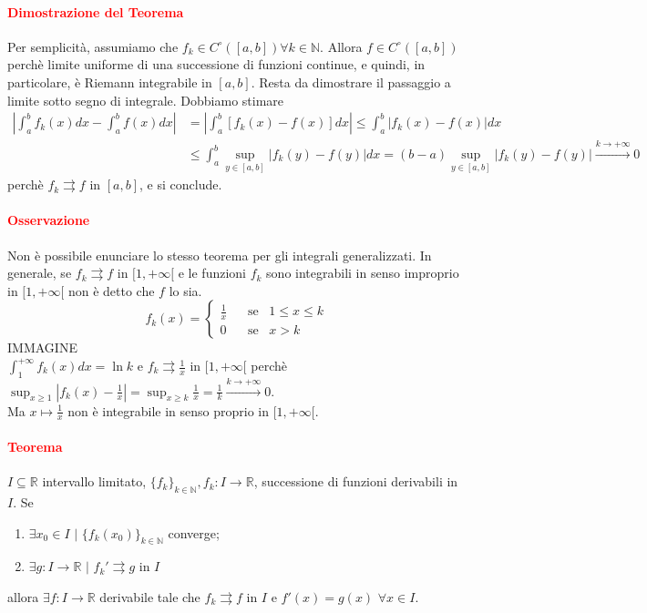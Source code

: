 \documentclass{article}
\newcommand{\R}{\mathbb{R}}
\newcommand{\N}{\mathbb{N}}
\begin{document}
\paragraph{\textcolor{red}{Dimostrazione del Teorema}}
Per semplicità, assumiamo che $f_k \in C^\circ([a,b])\forall k \in \N$. Allora $f\in C^\circ([a,b])$ perchè limite uniforme di una successione di funzioni continue, e quindi, in particolare, è Riemann integrabile in $[a,b]$. Resta da dimostrare il passaggio a limite sotto segno di integrale. Dobbiamo stimare 
\begin{align*}
    |\int_{a}^{b}f_k(x) dx -\int_{a}^{b}f(x)dx|&=|\int_{a}^{b} [f_k(x)-f(x)]dx|\leq \int_{a}^{b}|f_k(x)-f(x)|dx\\ &\leq \int_{a}^{b}\sup_{y \in [a,b]} |f_k(y)-f(y)|dx= (b-a)\sup_{y \in [a,b]} |f_k(y)-f(y)| \xrightarrow{k \rightarrow+\infty} 0
\end{align*}
perchè $f_k \rightrightarrows f$ in $[a,b]$, e si conclude.
\begin{flushright}
\large\Lightning
\end{flushright}

\paragraph{\textcolor{red}{Osservazione}}
Non è possibile enunciare lo stesso teorema per gli integrali generalizzati. In generale, se $f_k \rightrightarrows f$ in $[1,+\infty[$ e le funzioni $f_k$ sono integrabili in senso improprio in $[1,+\infty[$ non è detto che $f$ lo sia. \\
\begin{equation*}
    f_k(x)=\begin{cases}
        \frac{1}{x} \,\,\,\,\,&\text{se} \,\,\,\,\,1 \leq x \leq k\\
        0\,\,\,\,\,&\text{se}\,\,\,\,\, x >k
    \end{cases}
\end{equation*}
IMMAGINE\\
$\int_{1}^{+\infty}f_k(x)dx=\ln k$ e $f_k \rightrightarrows \frac{1}{x}$ in $[1,+\infty[$ perchè $\sup_{x \geq 1}|f_k(x) -\frac{1}{x}|=\sup_{x \geq k}\frac{1}{x}=\frac{1}{k} \xrightarrow{k \rightarrow +\infty} 0$.\\
Ma $x \mapsto \frac{1}{x}$ non è integrabile in senso proprio in $[1,+\infty[$.

\paragraph{\textcolor{red}{Teorema}}
$I \subseteq \R$ intervallo limitato, $\{f_k\}_{k \in \N}, f_k: I \rightarrow \R$, successione di funzioni derivabili in $I$. Se 
\begin{enumerate}
    \item $\exists x_0 \in I\,\, |\,\, \{f_k(x_0)\}_{k \in \N} $ converge;
    \item $\exists g:I \rightarrow \R \,\, |\,\, f_k' \rightrightarrows g$ in $I$
\end{enumerate}
allora $\exists f: I \rightarrow \R$ derivabile tale che $f_k\rightrightarrows f$ in $I$ e $f' (x)= g(x) \,\, \forall x \in I$.
\end{document}

